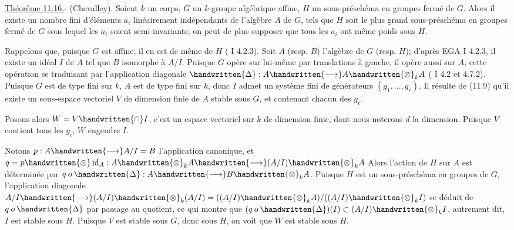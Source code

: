 \uline{Théorème 11.16.}- (Chevalley). Soient $k$ un corps, $G$ un $k$-groupe algébrique affine, $H$ un sous-préschéma en groupes fermé de $G$. Alors il existe un nombre fini d'éléments $a_i$ linéairement indépendants de l'algèbre $A$ de $G$, tels que $H$ soit le plus grand sous-préschéma en groupes fermé de $G$ sous lequel les $a_i$ soient semi-invariants; on peut de plus supposer que tous les $a_i$ ont même  poids\deleted{)} sous $H$.

Rappelons que, puisque $G$ est affine, il en est de même de $H$ ( I 4.2.3). Soit $A$ (resp. $B$) l'algèbre de $G$ (resp. $H$); d'après EGA I 4.2.3, il existe un idéal $I$ de $A$ tel que $B$  isomorphe à $A/I$. Puisque $G$ opère sur lui-même par translations à gauche, il opère aussi sur $A$, cette opération se traduisant par l'application diagonale $\handwritten{\Delta}:A\handwritten{\longrightarrow}A\handwritten{\otimes}_k A$ ( I 4.2 et 4.7.2). Puisque $G$ est de type fini sur $k$, $A$ est de type fini sur $k$, donc $I$  admet un système fini de générateurs $(g_1,\ldots,g_r)$. Il résulte de (11.9) qu'il existe un sous-espace vectoriel $V$ de dimension finie de $A$  stable sous $G$, et contenant chacun des $g_i$.

Posons alors $W=V\handwritten{\cap}I$, c'est un espace vectoriel sur $k$ de dimension finie, dont nous noterons $d$ la dimension. Puisque $V$ contient tous les $g_i$, $W$ engendre  $I$.

Notons $p:A\handwritten{\longrightarrow}A/I=B$ l'application canonique, et $q=p\handwritten{\otimes}\operatorname{id}_A:A\handwritten{\otimes}_k A\handwritten{\longrightarrow}(A/I)\handwritten{\otimes}_k A$ Alors l'action de $H$ sur $A$ est déterminée par $q\mathbin{o}\handwritten{\Delta}:A\handwritten{\longrightarrow}B\handwritten{\otimes}_k A$. Puisque $H$ est un sous-préschéma en groupes de $G$, l'application diagonale $A/I\handwritten{\longrightarrow}(A/I)\handwritten{\otimes}_k(A/I)=((A/I)\handwritten{\otimes}_k A)/((A/I)\handwritten{\otimes}_k I)$ se déduit de $q\mathbin{o}\handwritten{\Delta}$ par passage au quotient, ce qui montre que $(q\mathbin{o}\handwritten{\Delta})(I)\subset(A/I)\handwritten{\otimes}_k I$, autrement dit, $I$ est stable sous $H$. Puisque $V$ est stable sous $G$, donc sous $H$, on voit que $W$ est stable sous $H$.

